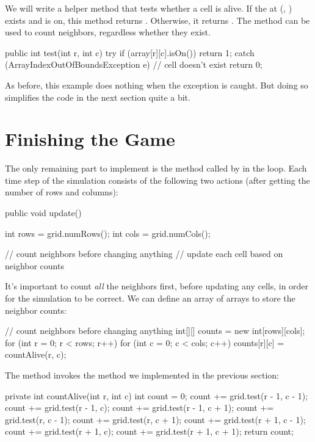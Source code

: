 We will write a helper method that tests whether a cell is alive.
If the  at (, ) exists and is on, this method returns .
Otherwise, it returns .
The method can be used to count neighbors, regardless whether they exist.

\begin{code}
public int test(int r, int c) {
    try {
        if (array[r][c].isOn()) {
            return 1;
        }
    } catch (ArrayIndexOutOfBoundsException e) {
        // cell doesn't exist
    }
    return 0;
}
\end{code}

As before, this example does nothing when the exception is caught.
But doing so simplifies the code in the next section quite a bit.


\section{Finishing the Game}

The only remaining part to implement is the  method called by  in the  loop.
Each time step of the simulation consists of the following two actions (after getting the number of rows and columns):

\begin{code}
public void update() {
    int rows = grid.numRows();
    int cols = grid.numCols();

    // count neighbors before changing anything
    // update each cell based on neighbor counts
}
\end{code}

It's important to count {\em all} the neighbors first, before updating any cells, in order for the simulation to be correct.
We can define an array of arrays to store the neighbor counts:

\begin{code}
// count neighbors before changing anything
int[][] counts = new int[rows][cols];
for (int r = 0; r < rows; r++) {
    for (int c = 0; c < cols; c++) {
        counts[r][c] = countAlive(r, c);
    }
}
\end{code}

The  method  invokes the  method we implemented in the previous section:

\begin{code}
private int countAlive(int r, int c) {
    int count = 0;
    count += grid.test(r - 1, c - 1);
    count += grid.test(r - 1, c);
    count += grid.test(r - 1, c + 1);
    count += grid.test(r, c - 1);
    count += grid.test(r, c + 1);
    count += grid.test(r + 1, c - 1);
    count += grid.test(r + 1, c);
    count += grid.test(r + 1, c + 1);
    return count;
}
\end{code}

